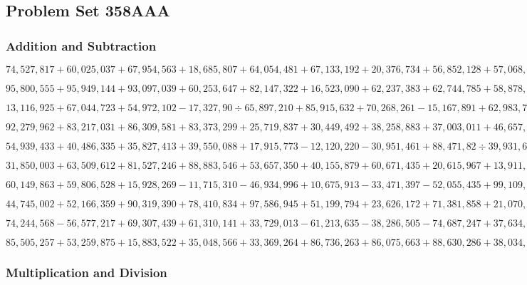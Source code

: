 \hypertarget{problem-set-358aaa}{%
\subsection{Problem Set 358AAA}\label{problem-set-358aaa}}

\hypertarget{addition-and-subtraction}{%
\subsubsection{Addition and
Subtraction}\label{addition-and-subtraction}}

\(74,527,817+60,025,037+67,954,563+18,685,807+64,054,481+67,133,192+20,376,734+56,852,128+57,068,212+59,977,145\)

\(95,800,555+95,949,144+93,097,039+60,253,647+82,147,322+16,523,090+62,237,383+62,744,785+58,878,649+29,460,972\)

\(13,116,925+67,044,723+54,972,102-17,327,90÷65,897,210+85,915,632+70,268,261-15,167,891+62,983,789-69,862,446\)

\(92,279,962+83,217,031+86,309,581+83,373,299+25,719,837+30,449,492+38,258,883+37,003,011+46,657,796+54,078,076\)

\(54,939,433+40,486,335+35,827,413+39,550,088+17,915,773-12,120,220-30,951,461+88,471,82÷39,931,64÷10,813,070\)

\(31,850,003+63,509,612+81,527,246+88,883,546+53,657,350+40,155,879+60,671,435+20,615,967+13,911,421+29,754,930\)

\(60,149,863+59,806,528+15,928,269-11,715,310-46,934,996+10,675,913-33,471,397-52,055,435+99,109,997+55,518,121\)

\(44,745,002+52,166,359+90,319,390+78,410,834+97,586,945+51,199,794+23,626,172+71,381,858+21,070,654+67,989,421\)

\(74,244,568-56,577,217+69,307,439+61,310,141+33,729,013-61,213,635-38,286,505-74,687,247+37,634,100+30,713,297\)

\(85,505,257+53,259,875+15,883,522+35,048,566+33,369,264+86,736,263+86,075,663+88,630,286+38,034,243+38,094,239\)

\hypertarget{multiplication-and-division}{%
\subsubsection{Multiplication and
Division}\label{multiplication-and-division}}

